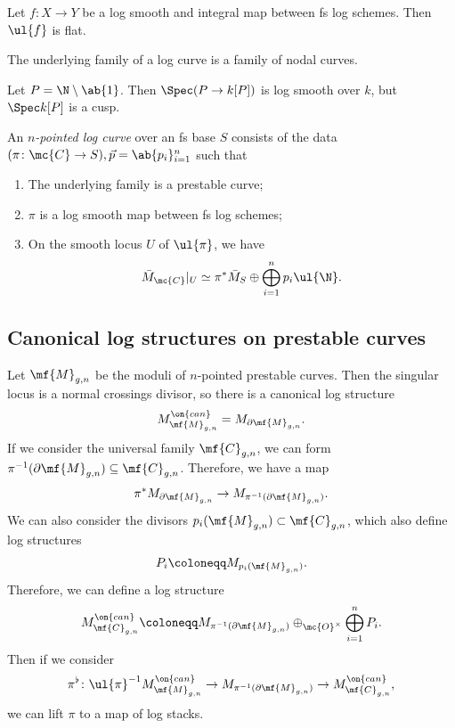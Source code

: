 \begin{prop}
    Let \(f \colon X \to Y\) be a log smooth and integral map between fs log schemes. Then \(\ul{f}\) is flat.
\end{prop}

\begin{thm}
    The underlying family of a log curve is a family of nodal curves.
\end{thm}

\begin{exm}
    Let \(P = \N \setminus \ab\{1\}\). Then \(\Spec (P \to k[P])\) is log smooth over \(k\), but \(\Spec k[P]\) is a cusp.
\end{exm}

\begin{defn}
    An \textit{\(n\)-pointed log curve} over an fs base \(S\) consists of the data \((\pi \colon \mc{C} \to S), \vec{p} = \ab\{p_i\}_{i=1}^n\) such that
    \begin{enumerate}
        \item The underlying family is a prestable curve;
        \item \(\pi\) is a log smooth map between fs log schemes;
        \item On the smooth locus \(U\) of \(\ul{\pi}\), we have
            \[ \bar{M}_{\mc{C}}|_U \simeq \pi^* \bar{M}_S \oplus \bigoplus_{i=1}^n p_i \ul{\N}. \]
    \end{enumerate}
\end{defn}

\subsection{Canonical log structures on prestable curves}%
\label{sub:Canonical log structures on prestable curves}

Let \(\mf{M}_{g,n}\) be the moduli of \(n\)-pointed prestable curves. Then the singular locus is a normal crossings divisor, so there is a canonical log structure
\[ M_{\mf{M}_{g,n}}^{\on{can}} = M_{\partial \mf{M}_{g,n}}. \]
If we consider the universal family \(\mf{C}_{g,n}\), we can form \(\pi^{-1}(\partial \mf{M}_{g,n}) \subseteq \mf{C}_{g,n}\). Therefore, we have a map
\[ \pi^* M_{\partial \mf{M}_{g,n}} \to M_{\pi^{-1}(\partial \mf{M}_{g,n})}. \]
We can also consider the divisors \(p_i(\mf{M}_{g,n}) \subset \mf{C}_{g,n}\), which also define log structures
\[ P_i \coloneqq M_{p_i(\mf{M}_{g,n})}. \]
Therefore, we can define a log structure
\[ M_{\mf{C}_{g,n}}^{\on{can}} \coloneqq M_{\pi^{-1}(\partial\mf{M}_{g,n})} \oplus_{\mc{O}^{\times}} \bigoplus_{i=1}^n P_i. \]
Then if we consider
\[ \pi^{\flat} \colon \ul{\pi}^{-1} M_{\mf{M}_{g,n}}^{\on{can}} \to M_{\pi^{-1}(\partial \mf{M}_{g,n})} \to M_{\mf{C}_{g,n}}^{\on{can}}, \]
we can lift \(\pi\) to a map of log stacks.

